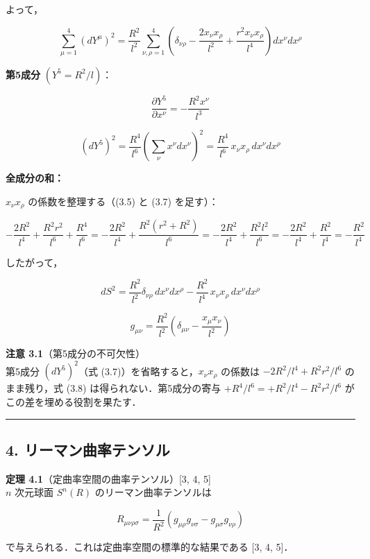 \documentclass[a4paper,11pt]{ltjsarticle}
\theoremstyle{definition}
\begin{document}
よって，

\[\sum_{\mu=1}^4(dY^\mu)^2 = \frac{R^2}{l^2}\sum_{\nu,\rho=1}^{4}\left(\delta_{\nu\rho} - \frac{2x_\nu x_\rho}{l^2} + \frac{r^2 x_\nu x_\rho}{l^4}\right)dx^\nu dx^\rho \tag{3.5}\]

\textbf{第5成分} \((Y^5 = R^2/l)\)：

\[\frac{\partial Y^5}{\partial x^\nu} = -\frac{R^2 x^\nu}{l^3} \tag{3.6}\]

\[\left(dY^5\right)^2 = \frac{R^4}{l^6}\left(\sum_\nu x^\nu dx^\nu\right)^2 = \frac{R^4}{l^6}\,x_\nu x_\rho\,dx^\nu dx^\rho \tag{3.7}\]

\textbf{全成分の和：}

\(x_\nu x_\rho\) の係数を整理する（(3.5) と (3.7) を足す）：

\[-\frac{2R^2}{l^4} + \frac{R^2 r^2}{l^6} + \frac{R^4}{l^6} = -\frac{2R^2}{l^4} + \frac{R^2(r^2+R^2)}{l^6} = -\frac{2R^2}{l^4} + \frac{R^2 l^2}{l^6} = -\frac{2R^2}{l^4} + \frac{R^2}{l^4} = -\frac{R^2}{l^4}\]

したがって，

\[dS^2 = \frac{R^2}{l^2}\delta_{\nu\rho}\,dx^\nu dx^\rho - \frac{R^2}{l^4}\,x_\nu x_\rho\,dx^\nu dx^\rho\]

\[\boxed{g_{\mu\nu} = \frac{R^2}{l^2}\left(\delta_{\mu\nu} - \frac{x_\mu x_\nu}{l^2}\right)} \tag{3.8}\]

\textbf{注意 3.1}（第5成分の不可欠性）\\
第5成分 \((dY^5)^2\)（式 (3.7)）を省略すると，\(x_\nu x_\rho\) の係数は \(-2R^2/l^4 + R^2 r^2/l^6\) のまま残り，式 (3.8) は得られない．第5成分の寄与 \(+R^4/l^6 = +R^2/l^4 - R^2 r^2/l^6\) がこの差を埋める役割を果たす．

\begin{center}\rule{0.5\linewidth}{0.5pt}\end{center}

\subsection{4. リーマン曲率テンソル}\label{ux30eaux30fcux30deux30f3ux66f2ux7387ux30c6ux30f3ux30bdux30eb}

\textbf{定理 4.1}（定曲率空間の曲率テンソル）{[}3, 4, 5{]}\\
\(n\) 次元球面 \(S^n(R)\) のリーマン曲率テンソルは

\[R_{\mu\nu\rho\sigma} = \frac{1}{R^2}(g_{\mu\rho}g_{\nu\sigma} - g_{\mu\sigma}g_{\nu\rho}) \tag{4.1}\]

で与えられる．これは定曲率空間の標準的な結果である {[}3, 4, 5{]}．
\end{document}
